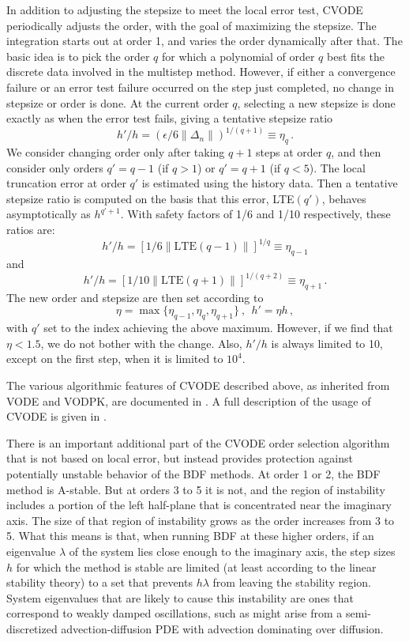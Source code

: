 In addition to adjusting the stepsize to meet the local error test,
CVODE periodically adjusts the order, with the goal of maximizing the
stepsize.  The integration starts out at order 1, and varies the order
dynamically after that.  The basic idea is to pick the order $q$ for
which a polynomial of order $q$ best fits the discrete data involved
in the multistep method.  However, if either a convergence failure or
an error test failure occurred on the step just completed, no change
in stepsize or order is done.  At the current order $q$, selecting a
new stepsize is done exactly as when the error test fails, giving a
tentative stepsize ratio
\[ h'/h = (\epsilon / 6 \|\Delta_n\| )^{1/(q+1)} \equiv \eta_q \, . \]
We consider changing order only after taking $q+1$ steps at order $q$,
and then consider only orders $q' = q - 1$ (if $q > 1$) or
$q' = q + 1$ (if $q < 5$).  The local truncation error at order $q'$
is estimated using the history data.  Then a tentative stepsize ratio
is computed on the basis that this error, LTE$(q')$, behaves
asymptotically as $h^{q'+1}$.  With safety factors of 1/6 and
1/10 respectively, these ratios are:
\[ h'/h = [1 / 6 \|\mbox{LTE}(q-1)\| ]^{1/q} \equiv \eta_{q-1} \]
and
\[ h'/h = [1 / 10 \|\mbox{LTE}(q+1)\| ]^{1/(q+2)} \equiv \eta_{q+1} \, . \]
The new order and stepsize are then set according to
\[ \eta = \max\{\eta_{q-1},\eta_q,\eta_{q+1}\} ~,~~ h' = \eta h \, , \]
with $q'$ set to the index achieving the above maximum.
However, if we find that $\eta < 1.5$, we do not bother with the
change.  Also, $h'/h$ is always limited to 10, except on the first
step, when it is limited to $10^4$.

The various algorithmic features of CVODE described above, as
inherited from VODE and VODPK, are documented in 
\cite{BBH:89,Byr:92,Hin:00}.  A full description of the usage
of CVODE is given in \cite{HiSe:03a}.

There is an important additional part of the CVODE order selection
algorithm that is not based on local error, but instead provides
protection against potentially unstable behavior of the BDF methods.
At order 1 or 2, the BDF method is A-stable.  But at orders 3 to 5 it
is not, and the region of instability includes a portion of the left
half-plane that is concentrated near the imaginary axis.  The size of
that region of instability grows as the order increases from 3 to 5.
What this means is that, when running BDF at these higher orders, if
an eigenvalue $\lambda$ of the system lies close enough to the
imaginary axis, the step sizes $h$ for which the method is stable are
limited (at least according to the linear stability theory) to a set
that prevents $h\lambda$ from leaving the stability region.  System
eigenvalues that are likely to cause this instability are ones that
correspond to weakly damped oscillations, such as might arise from a
semi-discretized advection-diffusion PDE with advection dominating
over diffusion.

